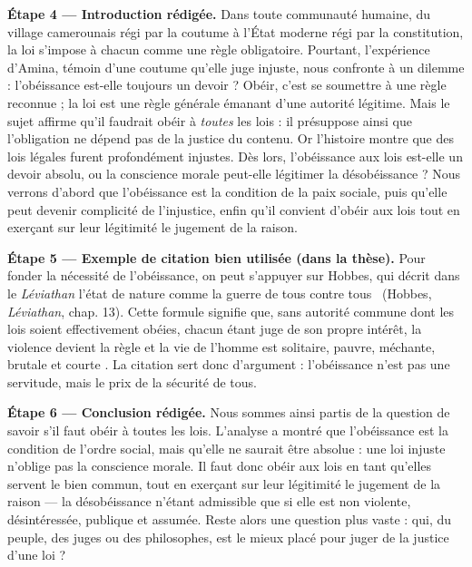 \documentclass[11pt]{article}
\begin{document}
\begin{exoresolu}
\textbf{Étape 4 — Introduction rédigée.} Dans toute communauté humaine, du village camerounais régi par la coutume à l'État moderne régi par la constitution, la loi s'impose à chacun comme une règle obligatoire. Pourtant, l'expérience d'Amina, témoin d'une coutume qu'elle juge injuste, nous confronte à un dilemme : l'obéissance est-elle toujours un devoir ? Obéir, c'est se soumettre à une règle reconnue ; la loi est une règle générale émanant d'une autorité légitime. Mais le sujet affirme qu'il faudrait obéir à \emph{toutes} les lois : il présuppose ainsi que l'obligation ne dépend pas de la justice du contenu. Or l'histoire montre que des lois légales furent profondément injustes. Dès lors, l'obéissance aux lois est-elle un devoir absolu, ou la conscience morale peut-elle légitimer la désobéissance ? Nous verrons d'abord que l'obéissance est la condition de la paix sociale, puis qu'elle peut devenir complicité de l'injustice, enfin qu'il convient d'obéir aux lois tout en exerçant sur leur légitimité le jugement de la raison.

\textbf{Étape 5 — Exemple de citation bien utilisée (dans la thèse).} Pour fonder la nécessité de l'obéissance, on peut s'appuyer sur Hobbes, qui décrit dans le \emph{Léviathan} l'état de nature comme \guillemotleft la guerre de tous contre tous \guillemotright\ (Hobbes, \emph{Léviathan}, chap. 13). Cette formule signifie que, sans autorité commune dont les lois soient effectivement obéies, chacun étant juge de son propre intérêt, la violence devient la règle et la vie de l'homme est \guillemotleft solitaire, pauvre, méchante, brutale et courte \guillemotright. La citation sert donc d'argument : l'obéissance n'est pas une servitude, mais le prix de la sécurité de tous.

\textbf{Étape 6 — Conclusion rédigée.} Nous sommes ainsi partis de la question de savoir s'il faut obéir à toutes les lois. L'analyse a montré que l'obéissance est la condition de l'ordre social, mais qu'elle ne saurait être absolue : une loi injuste n'oblige pas la conscience morale. Il faut donc obéir aux lois en tant qu'elles servent le bien commun, tout en exerçant sur leur légitimité le jugement de la raison — la désobéissance n'étant admissible que si elle est non violente, désintéressée, publique et assumée. Reste alors une question plus vaste : qui, du peuple, des juges ou des philosophes, est le mieux placé pour juger de la justice d'une loi ?
\end{exoresolu}
\end{document}
